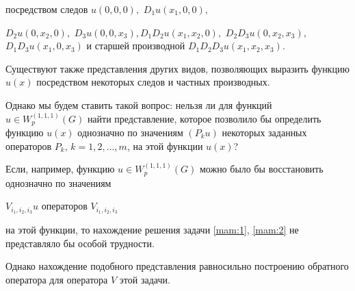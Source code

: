 посредством следов $u( 0, 0, 0) ,$ $D_1  u\left( x_1 , 0, 0\right) ,$

$D_2  u\left( 0, x_2 , 0\right) ,$ $D_3  u\left( 0, 0, x_3  \right) ,$\linebreak $D_1  D_2  u\left( x_1  ,x_2 , 0\right) ,$ $D_2  D_3  u\left( 0, x_2  ,x_3  \right),$ $D_1  D_3  u\left( x_1 , 0, x_3  \right)$  и старшей производной  $D_1  D_2  D_3  u\left( x_1  ,x_2  ,x_3  \right)$.  

Существуют также представления других видов, позволяющих выразить функцию $u(x) $  посредством некоторых следов и частных производных. 

Однако  мы будем ставить такой вопрос: нельзя ли для функций  $u\in W_{p}^{( 1, 1, 1) } ( G)$  найти представление, которое позволило бы определить функцию  $u(x) $ однозначно по значениям $( P_{k} u)$ некоторых заданных операторов  $P_{k}$, $k=1, 2, \dots, m$, на этой функции   $u(x)$? 

Если, например, функцию $u\in W_{p}^{(1, 1, 1) } ( G)$  можно было бы восстановить однозначно по значениям






$V_{i_1 ,i_2 ,i_3 }u$ операторов $V_{i_1 , i_2 , i_3 }$ %

на этой функции, то нахождение решения задачи \eqref{mam:1}, \eqref{mam:2} не представляло бы особой трудности. 

Однако нахождение подобного представления равносильно построению обратного оператора для оператора $V$   этой задачи.









